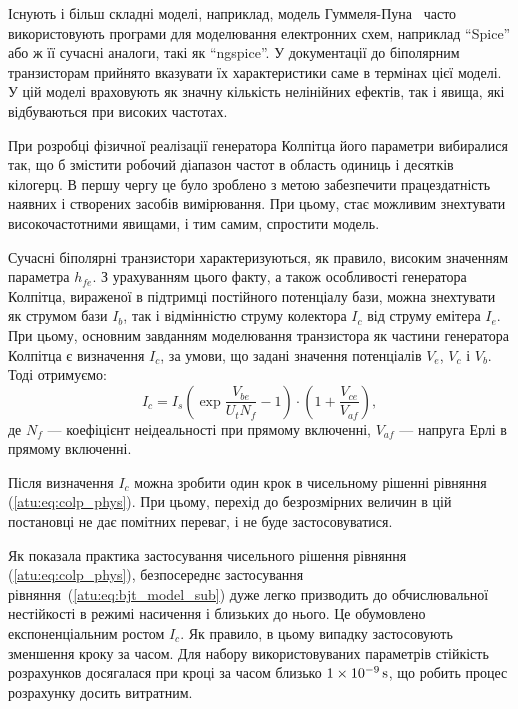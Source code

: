 Існують і більш складні моделі, наприклад, модель
Гуммеля-Пуна~\cite{gummel_poon_1970,shiskin_electronnie_pribori} часто використовують
програми для моделювання електронних схем, наприклад ``Spice'' або ж її сучасні аналоги,
такі як ``ngspice''. У документації до
біполярним транзисторам прийнято вказувати їх характеристики
саме в термінах цієї моделі. У цій моделі враховують як значну
кількість нелінійних ефектів, так і явища, які відбуваються
при високих частотах.

При розробці фізичної реалізації генератора Колпітца його
параметри вибиралися так, що б змістити робочий діапазон
частот в область одиниць і десятків кілогерц. В першу чергу
це було зроблено з метою забезпечити працездатність наявних
і створених засобів вимірювання. При цьому, стає можливим
знехтувати високочастотними явищами, і тим самим, спростити
модель.

Сучасні біполярні транзистори характеризуються, як
правило, високим значенням параметра
$h_{fe}$. З урахуванням цього факту, а також особливості генератора
Колпітца, вираженої в підтримці постійного потенціалу бази,
можна знехтувати як струмом бази
$I_b$, так і відмінністю струму колектора
$I_c$ від струму емітера
$I_e$. При цьому, основним завданням моделювання транзистора як
частини генератора Колпітца є визначення
$ I_c $, за умови, що задані значення потенціалів
$ V_e $,
$ V_c $ і
$ V_b $. Тоді отримуємо:
%
\begin{equation}
  I_c
  = I_s \left( \exp\frac{V_{be}}{U_t N_f} - 1 \right)
    \cdot
    \left( 1 + \frac{V_{ce}}{V_{af}}\right),
  \label{atu:eq:bjt_model_sub}
\end{equation}
%
де
$N_f$ --- коефіцієнт неідеальності при прямому включенні,
$ V_{af} $ --- напруга Ерлі в прямому включенні.

Після визначення
$ I_c $ можна зробити один крок в чисельному рішенні рівняння
(\ref{atu:eq:colp_phys}). При цьому, перехід до безрозмірних величин в цій
постановці не дає помітних переваг, і не буде застосовуватися.

Як показала практика застосування чисельного рішення рівняння
(\ref{atu:eq:colp_phys}), безпосереднє застосування рівняння~(\ref{atu:eq:bjt_model_sub})
дуже легко призводить до обчислювальної нестійкості в режимі
насичення і близьких до нього. Це обумовлено експоненціальним ростом
$ I_c $. Як правило, в цьому випадку застосовують зменшення кроку
за часом. Для набору використовуваних параметрів стійкість
розрахунков досягалася при кроці за часом близько
$ \SI{1E-9}{\second} $, що робить процес розрахунку досить витратним.

